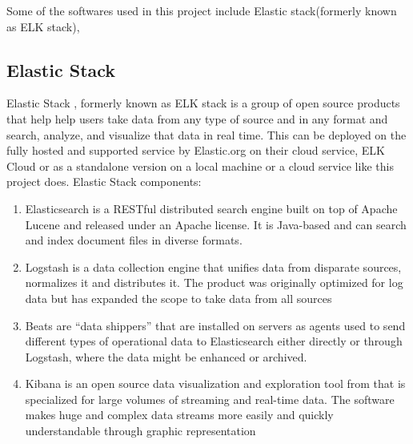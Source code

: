 \documentclass[]{report}
\begin{document}
Some of the softwares used in this project include Elastic stack(formerly known as ELK stack), 



\subsection{Elastic Stack}
Elastic Stack , formerly known as ELK stack is a group of open source products that help help users take data from any type of source and in any format and search, analyze, and visualize that data in real time. This can be deployed on the fully hosted and supported service by Elastic.org on their cloud service, ELK Cloud or as a standalone version on a local machine or a cloud service like this project does. 
\newline
\newline
Elastic Stack components:
\begin{enumerate}
    \item 
    Elasticsearch is a RESTful distributed search engine built on top of Apache Lucene and released under an Apache license. It is Java-based and can search and index document files in diverse formats.
    \item
    Logstash is a data collection engine that unifies data from disparate sources, normalizes it and distributes it. The product was originally optimized for log data but has expanded the scope to take data from all sources
    \item
    Beats are “data shippers” that are installed on servers as agents used to send different types of operational data to Elasticsearch either directly or through Logstash, where the data might be enhanced or archived.
    \item
    Kibana is an open source data visualization and exploration tool from that is specialized for large volumes of streaming and real-time data. The software makes huge and complex data streams more easily and quickly understandable through graphic representation
    
\end{enumerate}
\end{document}
